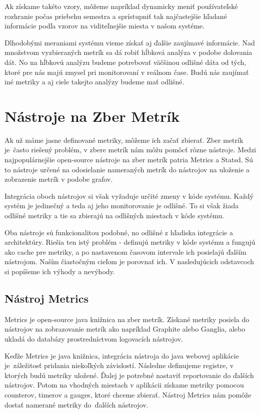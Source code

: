 \documentclass[a4paper, usesections, upjsfrontpage, thesismargins, thesislinespacing]{rnthesis}
\begin{document}
Ak získame takéto vzory, môžeme napríklad dynamicky meniť používateľské rozhranie počas priebehu semestra a sprístupniť tak najčastejšie hľadané informácie podľa vzorov na viditeľnejšie miesta v našom systéme.

Dlhodobými meraniami systému vieme získať aj ďalšie zaujímavé informácie.
Nad množstvom vyzbieraných metrík sa dá robiť hĺbková analýza v podobe dolovania dát.
No na hĺbkovú analýzu budeme potrebovať väčšinou odlišné dáta od tých, ktoré pre nás majú zmysel pri monitorovaní v reálnom čase.
Budú nás zaujímať iné metriky a aj ciele takejto analýzy budeme mať odlišné.

\newpage

\section{Nástroje na Zber Metrík}

Ak už máme jasne definované metriky, môžeme ich začať zbierať.
Zber metrík je~často riešený problém, v zbere metrík nám môžu pomôcť rôzne nástroje.
Medzi naj\-populár\-nejšie open-source nástroje na zber metrík patria Metrics a Statsd.
Sú to nástroje určené na odosielanie nameraných metrík do nástrojov na uloženie a zobrazenie metrík v podobe grafov.

Integrácia oboch nástrojov si však vyžaduje určité zmeny v kóde systému.
Každý systém je jedinečný a teda aj jeho monitorovanie je odlišné.
To si však žiada odlišné metriky a tie sa zbierajú na odlišných miestach v kóde systému.

Oba nástroje sú funkcionalitou podobné, no odlišné z hľadiska integrácie a architektúry.
Riešia ten istý problém - definujú metriky v kóde systému a fungujú ako cache pre metriky, a po nastavenom časovom intervale ich posielajú ďalším nástrojom.
Naším čiastočným cieľom je porovnať ich.
V nasledujúcich odstavcoch si popíšeme ich výhody a nevýhody.

\subsection{Nástroj Metrics}

Metrics je open-source java knižnica na zber metrík.
Získané metriky posiela do nástrojov na zobrazovanie metrík ako napríklad Graphite alebo Ganglia, alebo ukladá do databázy prostredníctvom logovacích nástrojov.

Keďže Metrics je java knižnica, integrácia nástroja do java webovej aplikácie je~záležitosť pridania niekoľkých závislostí.
Následne definujeme registre, v ktorých budú metriky uložené.
Ďalej je potrebné nastaviť reportovanie do ďalších nástrojov.
Potom na vhodných miestach v aplikácii získame metriky pomocou counterov, timerov a gauges, ktoré chceme zbierať.
Nástroj Metrics nám pomôže dostať namerané metriky do~ďalších nástrojov.
\end{document}
